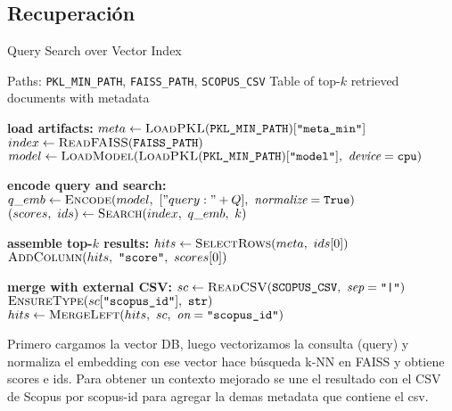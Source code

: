 \subsection{Recuperación}
\begin{algorithmEN}[H]
  \caption{Query Search over Vector Index}
  \begin{algorithmic}[1]
    \Require Paths: \texttt{PKL\_MIN\_PATH}, \texttt{FAISS\_PATH}, \texttt{SCOPUS\_CSV}
    \Ensure Table of top-$k$ retrieved documents with metadata

    \Statex \textbf{load artifacts:}
    \State \quad $meta \gets \textsc{LoadPKL}(\texttt{PKL\_MIN\_PATH})[\texttt{"meta\_min"}]$
    \State \quad $index \gets \textsc{ReadFAISS}(\texttt{FAISS\_PATH})$
    \State \quad $model \gets \textsc{LoadModel}(\textsc{LoadPKL}(\texttt{PKL\_MIN\_PATH})[\texttt{"model"}],\ \textit{device}=\texttt{cpu})$

    \Statex \textbf{encode query and search:}
    \State \quad $q\_emb \gets \textsc{Encode}(model,\ ["query: "+Q],\ \textit{normalize}=\texttt{True})$
    \State \quad $(scores,\ ids) \gets \textsc{Search}(index,\ q\_emb,\ k)$ 

    \Statex \textbf{assemble top-$k$ results:}
    \State \quad $hits \gets \textsc{SelectRows}(meta,\ ids[0])$
    \State \quad $\textsc{AddColumn}(hits,\ \texttt{"score"},\ scores[0])$

    \Statex \textbf{merge with external CSV:}
    \State \quad $sc \gets \textsc{ReadCSV}(\texttt{SCOPUS\_CSV},\ \textit{sep}=\texttt{"|"})$ 
    \State \quad $\textsc{EnsureType}(sc[\texttt{"scopus\_id"}],\ \texttt{str})$
    \State \quad $hits \gets \textsc{MergeLeft}(hits,\ sc,\ \textit{on}=\texttt{"scopus\_id"})$
  \end{algorithmic}
  \label{alg:search_vector_index}
\end{algorithmEN}

Primero cargamos la vector DB, luego vectorizamos  la consulta (query) y normaliza el embedding con ese vector hace búsqueda k-NN en FAISS y obtiene scores e ids.
Para obtener un contexto mejorado se une el resultado con el CSV de Scopus por scopus-id para agregar la demas metadata que contiene el csv.
